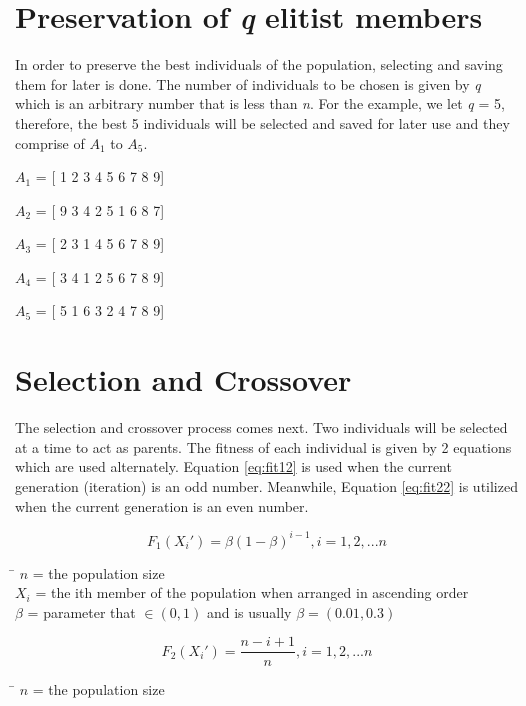 \section{Preservation of \emph{q} elitist members} \label{elitist1}
\indent \indent In order to preserve the best individuals of the population, selecting and saving them for later is done. The number of individuals to be chosen is given by \emph{q} which is an arbitrary number that is less than \emph{n}. For the example, we let \emph{q} = 5, therefore, the best 5 individuals will be selected and saved for later use and they comprise of $A_{1}$ to $A_5$.

$A_{1}$ = [ 1 2 3 4 5 6 7 8 9] \par 
$A_{2}$ = [ 9 3 4 2 5 1 6 8 7] \par 
$A_{3}$ = [ 2 3 1 4 5 6 7 8 9] \par 
$A_{4}$ = [ 3 4 1 2 5 6 7 8 9] \par 
$A_{5}$ = [ 5 1 6 3 2 4 7 8 9] \par 

\section{Selection and Crossover}
\indent \indent The selection and crossover process comes next. Two individuals will be selected at a time to act as parents. The fitness of each individual is given by 2 equations which are used alternately. Equation \ref{eq:fit12} is used when the current generation (iteration) is an odd number. Meanwhile, Equation \ref{eq:fit22} is utilized when the current generation is an even number.

\begin{equation}
	\label{eq:fit12}
	F_1(X_i')= \beta (1 - \beta )^{i-1}   , i= 1, 2, ... n
\end{equation}
\begin{tabbing}
	\= \kill
	$n$\> = the population size\\
	$X_i$\> = the ith member of the population when arranged in ascending order\\
	$\beta$ \> =  parameter that $\in(0,1)$ and is usually $\beta=(0.01, 0.3)$\cite{realnumbergenetic}\\
\end{tabbing}
\begin{equation}
	\label{eq:fit22}
	F_2(X_i')= \frac{n-i+1}{n}  , i=1, 2 ,... n
\end{equation}
\begin{tabbing}
	\= \kill
	$n$\> = the population size\\
\end{tabbing}

